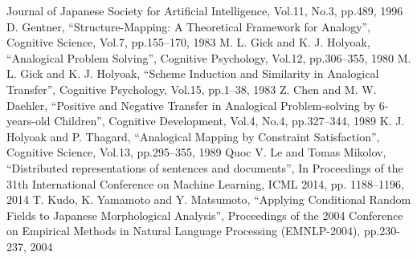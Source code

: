 \documentclass{deimj}
\begin{document}
\begin{thebibliography}{99}
      Journal of Japanese Society for Artificial Intelligence,  Vol.11, No.3,  pp.489, 1996
    D. Gentner,
      ``Structure-Mapping: A Theoretical Framework for Analogy'',
      Cognitive Science, Vol.7, pp.155–170, 1983
    M. L. Gick and K. J. Holyoak,
      ``Analogical Problem Solving'',
      Cognitive Psychology, Vol.12, pp.306–355, 1980
    M. L. Gick and K. J. Holyoak,
      ``Scheme Induction and Similarity in Analogical Transfer'',
      Cognitive Psychology, Vol.15, pp.1–38, 1983
    Z. Chen and M. W. Daehler,
      ``Positive and Negative Transfer in Analogical Problem-solving by 6-years-old Children'',
      Cognitive Development, Vol.4, No.4, pp.327–344, 1989
    K. J. Holyoak and P. Thagard,
      ``Analogical Mapping by Constraint Satisfaction'',
      Cognitive Science, Vol.13, pp.295–355, 1989
    Quoc V. Le and Tomas Mikolov,
      ``Distributed representations of sentences and documents'',
      In Proceedings of the 31th International Conference on Machine Learning, ICML 2014, pp. 1188–1196, 2014
    T. Kudo, K. Yamamoto and Y. Matsumoto,
    ``Applying Conditional Random Fields to Japanese Morphological Analysis'',
    Proceedings of the 2004 Conference on Empirical Methods in Natural Language Processing (EMNLP-2004), pp.230-237, 2004
\end{thebibliography}
\end{document}
